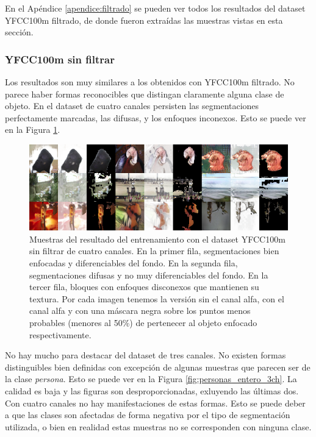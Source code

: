 \documentclass[spanish]{report}
\begin{document}
En el Apéndice \ref{apendice:filtrado} se pueden ver todos los resultados del dataset YFCC100m filtrado, de donde fueron extraídas las muestras vistas en esta sección.

\newpage

\subsubsection{YFCC100m sin filtrar}

Los resultados son muy similares a los obtenidos con YFCC100m filtrado. No parece haber formas reconocibles que distingan claramente alguna clase de objeto. En el dataset de cuatro canales persisten las segmentaciones perfectamente marcadas, las difusas, y los enfoques inconexos. Esto se puede ver en la Figura \ref{fig:resultados_4chan_enter}.

\begin{figure}[h]
\centering
 \includegraphics[width=\linewidth]{resultados_4chan_entero.png}
   \caption{Muestras del resultado del entrenamiento con el dataset YFCC100m sin filtrar de cuatro canales.  En la primer fila, segmentaciones bien enfocadas y diferenciables del fondo. En la segunda fila, segmentaciones difusas y no muy diferenciables del fondo. En la tercer fila,  bloques con enfoques disconexos que mantienen su textura. Por cada imagen tenemos la versión sin el canal alfa, con el canal alfa y con una máscara negra sobre los puntos menos probables (menores al 50\%) de pertenecer al objeto enfocado respectivamente.}
  \label{fig:resultados_4chan_enter}
\end{figure}

No hay mucho para destacar del dataset de tres canales. No existen formas distinguibles bien definidas con excepción de algunas muestras que parecen ser de la clase \textit{persona}. Esto se puede ver en la Figura \ref{fig:personas_entero_3ch}. La calidad es baja y las figuras son desproporcionadas, exluyendo las últimas dos. Con cuatro canales no hay manifestaciones de estas formas. Esto se puede deber a que las clases son afectadas de forma negativa por el tipo de segmentación utilizada, o bien en realidad estas muestras no se corresponden con ninguna clase.
\end{document}
